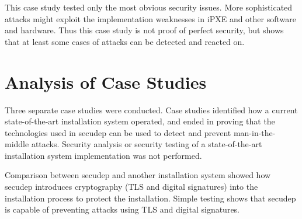 This case study tested only the most obvious security issues. More
sophisticated attacks might exploit the implementation weaknesses in
iPXE and other software and hardware. Thus this case study is not
proof of perfect security, but shows that at least some cases of
attacks can be detected and reacted on.


\section{Analysis of Case Studies}

Three separate case studies were conducted. Case studies identified
how a current state-of-the-art installation system operated, and ended
in proving that the technologies used in secudep can be used to detect
and prevent man-in-the-middle attacks. Security analysis or security
testing of a state-of-the-art installation system implementation was
not performed.

Comparison between secudep and another installation system showed how
secudep introduces cryptography (TLS and digital signatures) into the
installation process to protect the installation. Simple testing shows
that secudep is capable of preventing attacks using TLS and digital
signatures.
